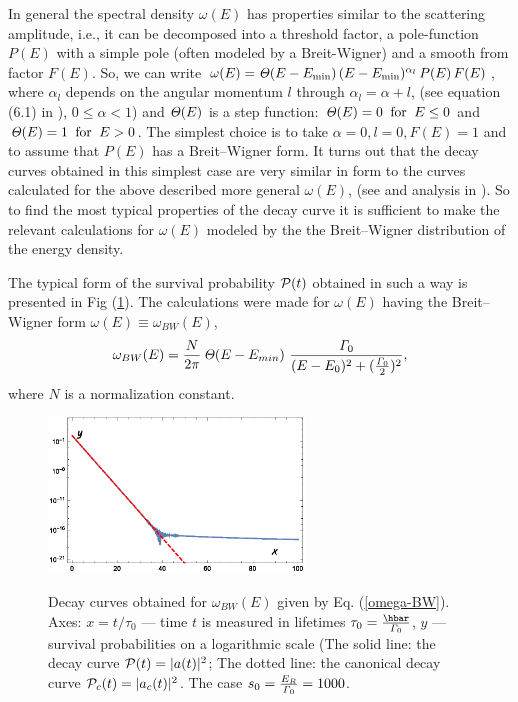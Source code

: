 \documentclass[12pt]{article}
\begin{document}
In general the spectral density $\omega(E)$ has properties similar to the scattering amplitude, i.e., it can be
decomposed into a threshold factor, a pole-function $P(E)$ with a simple pole (often modeled by a Breit-Wigner)
and a smooth from factor $F(E)$.
So, we can write $\omega(E)= {\it\Theta}(E-E_{\rm min})\,(E-E_{\rm min})^{\alpha_{l}}\,P(E)\,F(E) $,
where
$\alpha_{l}$ depends on the angular momentum $l$ through $\alpha_{l} = \alpha + l$, \cite{fonda}
(see equation (6.1) in \cite{fonda}),  $0 \leq \alpha <1$)
 and ${\it\Theta}(E)$ is a step function: ${\it\Theta}(E) = 0\;\;{\rm  for}\;\; E \leq 0$
and ${\it\Theta}(E) = 1\;\;{\rm for}\;\;E>0  $. The simplest choice is to take $\alpha = 0, l=0, F(E) = 1$ and
to assume that $P(E)$ has a Breit--Wigner form.
It turns out that the decay curves obtained in this simplest case are very similar in form to the curves calculated for
the above described
more general $\omega (E)$,
(see \cite{nowakowski} and analysis in \cite{fonda}).
So to find the most typical properties of the decay curve it is sufficient to make the relevant calculations for  $\omega (E)$ modeled by the the Breit--Wigner
distribution of the energy density.

The typical  form of the survival probability ${\cal P}(t)$ obtained in such a way is presented in Fig (\ref{f1}).
The calculations were made for $\omega (E)$ having the Breit--Wigner form
$\omega (E) \equiv \omega_{BW} (E)$,
\begin{equation}
\omega_{BW}(E) =  \frac{N}{2\pi}\,  {\it\Theta} (E - E_{min}) \
\frac{{\it\Gamma}_{0}}{(E-E_{0})^{2} +
(\frac{{\it\Gamma}_{0}}{2})^{2}}, \label{omega-BW}
\end{equation}
where $N$ is a normalization constant.
\begin{figure}[h!]
\begin{center}
\includegraphics[width=68mm]{f1a.eps}\\
\caption{Decay curves obtained for $\omega_{BW}(E)$ given by Eq. (\ref{omega-BW}).
Axes: $x =t / \tau_{0} $ --- time $t$ is measured in lifetimes
$\tau_{0}= \frac{\hbar}{{\it\Gamma}_{0}}$,    $y$ --- survival probabilities on a logarithmic scale (The solid line:  the decay curve ${\cal P}(t) = |a(t)|^{2}$; The dotted line:  the canonical decay curve
${\cal P}_{c}(t) = |a_{c}(t)|^{2}$. The case $s_{0} = \frac{E_{R}}{{\it\Gamma}_{0}} = 1000$.}
  \label{f1}
\end{center}
\end{figure}
\end{document}
